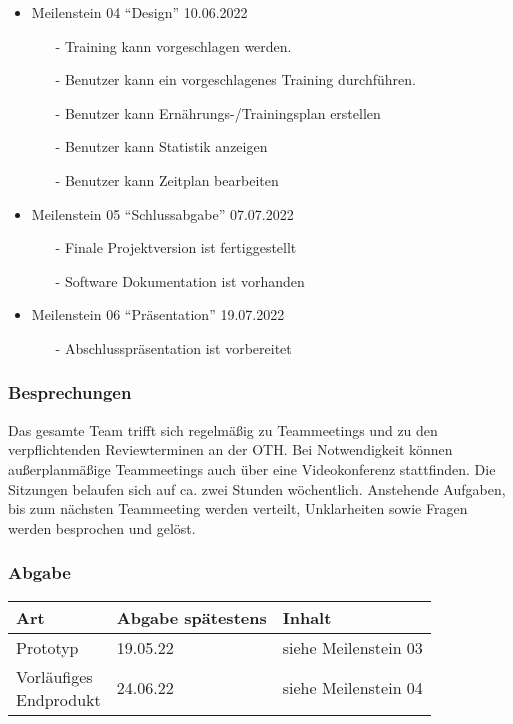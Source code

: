 \documentclass[12pt,a4paper,onecolumn]{article}
\begin{document}
\begin{itemize}
    \item Meilenstein 04 ``Design'' 10.06.2022
    \begin{itemize}
        \item[-] Training kann vorgeschlagen werden.
        \item[-] Benutzer kann ein vorgeschlagenes Training durchführen.
        \item[-] Benutzer kann Ernährungs-/Trainingsplan erstellen
        \item[-] Benutzer kann Statistik anzeigen
        \item[-] Benutzer kann Zeitplan bearbeiten
    \end{itemize}
    
    \item Meilenstein 05 ``Schlussabgabe'' 07.07.2022
    \begin{itemize}
        \item[-] Finale Projektversion ist fertiggestellt
        \item[-] Software Dokumentation ist vorhanden
    \end{itemize}
    
    \item Meilenstein 06 ``Präsentation'' 19.07.2022
    \begin{itemize}
        \item[-] Abschlusspräsentation ist vorbereitet
    \end{itemize}
  
  
  
\end{itemize}


\subsubsection{Besprechungen}
Das gesamte Team trifft sich regelmäßig zu Teammeetings und zu den verpflichtenden Reviewterminen an der OTH. Bei Notwendigkeit können außerplanmäßige Teammeetings auch über eine Videokonferenz stattfinden. Die Sitzungen belaufen sich auf ca. zwei Stunden wöchentlich. Anstehende Aufgaben, bis zum nächsten Teammeeting werden verteilt, Unklarheiten sowie Fragen werden besprochen und gelöst. 
\subsubsection{Abgabe}
\begin{tabularx}{\textwidth}{|X|X|X|}
\hline
\textbf{Art} & \textbf{Abgabe spätestens} & \textbf{Inhalt}\\
\hline
Prototyp & 19.05.22 & siehe Meilenstein 03\\
\hline
\shortstack{Vorläufiges\\ Endprodukt} & 24.06.22 & siehe Meilenstein 04\\
\hline
\end{tabularx}
\end{document}
